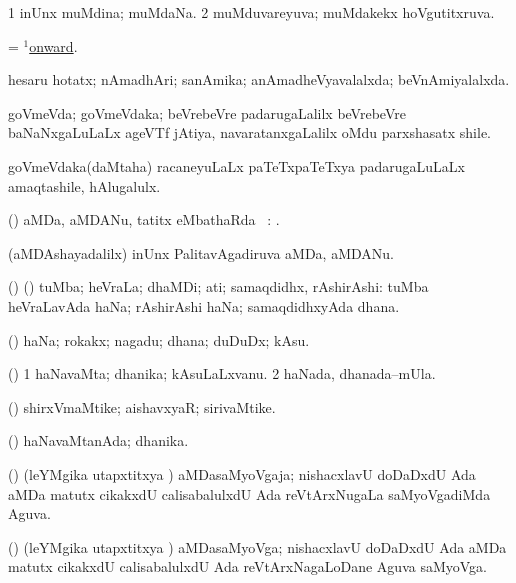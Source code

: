 \bentry
{}
\gl{\gu}
\bmng
\bnum
\num{1} inUnx muMdina; muMdaNa. 
\num{2} muMduvareyuva; muMdakekx hoVgutitxruva. 
\enum
\emng
\eentry

\bentry
{}
\gl{\kirxvi}
\bmng
= \hyperlink{onward(1)}{$^1$onward}. 
\emng
\eentry

\bentry
{}
\gl{\gu}
\bmng
hesaru hotatx; nAmadhAri; sanAmika; anAmadheVyavalalxda; beVnAmiyalalxda. 
\emng
\eentry

\bentry
{}
\gl{\nA}
\bmng
goVmeVda; goVmeVdaka; beVrebeVre padarugaLalilx beVrebeVre baNaNxgaLuLaLx ageVTf jAtiya, navaratanxgaLalilx oMdu parxshasatx shile. 
\emng

\noindent
\gl{\pagu}
\bmng
{} goVmeVdaka(daMtaha) racaneyuLaLx paTeTxpaTeTxya padarugaLuLaLx amaqtashile, hAlugalulx. 
\emng
\eentry

\bentry
{}
\gl{\sapUpa}
\bmng
(\jiVvi) aMDa, aMDANu, tatitx eMbathaRda \sapUpa\ : . 
\emng
\eentry

\bentry
{}
\gl{\nA}
\bmng
(aMDAshayadalilx) inUnx PalitavAgadiruva aMDa, aMDANu. 
\emng
\eentry

\bentry
{}
\gl{\nA}
\bmng
(\bava) (\AmA) tuMba; heVraLa; dhaMDi; ati; samaqdidhx, rAshirAshi:  tuMba heVraLavAda haNa; rAshirAshi haNa; samaqdidhxyAda dhana. 
\emng
\eentry

\bentry
{}
\gl{\nA}
\bmng
(\ashi) haNa; rokakx; nagadu; dhana; duDuDx; kAsu. 
\emng
\eentry

\bentry
{}
\gl{\nA}
\bmng
(\ashi) 
\bnum
\num{1} haNavaMta; dhanika; kAsuLaLxvanu. 
\num{2} haNada, dhanada--mUla. 
\enum
\emng
\eentry

\bentry
{}
\gl{\nA}
\bmng
(\ashi) shirxVmaMtike; aishavxyaR; sirivaMtike. 
\emng
\eentry

\bentry
{}
\gl{\gu}
\bmng
(\ashi) haNavaMtanAda; dhanika. 
\emng
\eentry

\bentry
{}
\gl{\gu}
\bmng
(\jiVvi) (leYMgika utapxtitxya \vi) aMDasaMyoVgaja; nishacxlavU doDaDxdU Ada aMDa matutx cikakxdU calisabalulxdU Ada reVtArxNugaLa saMyoVgadiMda Aguva. 
\emng
\eentry

\bentry
{}
\gl{\nA}
\bmng
(\jiVvi) (leYMgika utapxtitxya \vi) aMDasaMyoVga; nishacxlavU doDaDxdU Ada aMDa matutx cikakxdU calisabalulxdU Ada reVtArxNagaLoDane Aguva saMyoVga. 
\emng
\eentry

